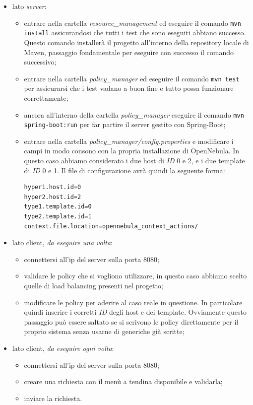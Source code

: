 \begin{itemize}
    \item lato \emph{server}:
\begin{itemize}
    \item entrare nella cartella \emph{resource\_management} ed eseguire il comando \texttt{mvn install} assicurandosi che tutti i test che sono eseguiti abbiano successo. Questo comando installerà il progetto all'interno della repository locale di Maven, passaggio fondamentale per eseguire con successo il comando successivo;
    \item entrare nella cartella \emph{policy\_manager} ed eseguire il comando \texttt{mvn test} per assicurarsi che i test vadano a buon fine e tutto possa funzionare correttamente;
    \item ancora all'interno della cartella \emph{policy\_manager} eseguire il comando \texttt{mvn spring-boot:run} per far partire il server gestito con Spring-Boot;
    \item entrare nella cartella \emph{policy\_manager/config.properties} e modificare i campi in modo consono con la propria installazione di OpenNebula. In questo caso abbiamo considerato i due host di \emph{ID} 0 e 2, e i due template di \emph{ID} 0 e 1. Il file di configurazione avrà quindi la seguente forma:
    \begin{lstlisting}[xleftmargin=1em, label={code:config_properties}, caption={config.properties}]
hyper1.host.id=0
hyper2.host.id=2
type1.template.id=0
type2.template.id=1
context.file.location=opennebula_context_actions/
    \end{lstlisting}
\end{itemize}
    \item lato client, \emph{da eseguire una volta}:
    \begin{itemize}
        \item connettersi all'ip del server sulla porta 8080;
        \item validare le policy che si vogliono utilizzare, in questo caso abbiamo scelto quelle di load balancing presenti nel progetto;
        \item modificare le policy per aderire al caso reale in questione. In particolare quindi inserire i corretti \emph{ID} degli host e dei template. Ovviamente questo passaggio può essere saltato se si scrivono le policy direttamente per il proprio sistema senza usarne di generiche già scritte;
    \end{itemize}
    \item lato client, \emph{da eseguire ogni volta}:
    \begin{itemize}
        \item connettersi all'ip del server sulla porta 8080;
        \item creare una richiesta con il menù a tendina disponibile e validarla;
        \item inviare la richiesta.
    \end{itemize}
\end{itemize}
